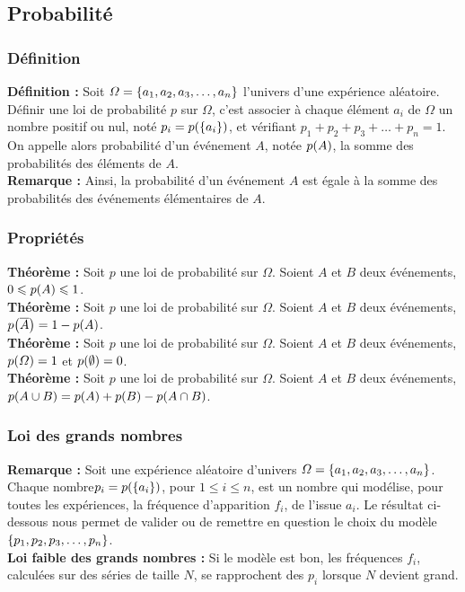 \documentclass[a4paper,titlepage]{article}
\let\oldleft\left
\renewcommand{\left}{\mathopen{}\mathclose\bgroup\oldleft}
\let\oldright\right
\renewcommand{\right}{\aftergroup\egroup\oldright}
\begin{document}
    \subsection{Probabilité}
        \subsubsection{Définition}
            \textbf{Définition :} Soit $\varOmega=\left\{a_{1},a_{2},a_{3},\ldots,a_{n}\right\}$ l’univers d’une expérience aléatoire. Définir une loi de probabilité $p$ sur $\varOmega$, c’est associer à chaque élément $a_{i}$ de $\varOmega$ un nombre positif ou nul, noté $p_{i}=p\left(\left\{a_{i}\right\}\right)$, et vérifiant $p_{1}+p_{2}+p_{3}+\ldots+p_{n}=1$. On appelle alors probabilité d’un événement $A$, notée $p\left(A\right)$, la somme des probabilités des éléments de $A$.
            \\
            \textbf{Remarque :} Ainsi, la probabilité d’un événement $A$ est égale à la somme des probabilités des événements élémentaires de $A$.
        \subsubsection{Propriétés}
            \textbf{Théorème :} Soit $p$ une loi de probabilité sur $\varOmega$. Soient $A$ et $B$ deux événements, $0\leqslant p\left(A\right)\leqslant1$.
            \\
            \textbf{Théorème :} Soit $p$ une loi de probabilité sur $\varOmega$. Soient $A$ et $B$ deux événements, $p\left(\overline{A}\right)=1-p\left(A\right)$.
            \\
            \textbf{Théorème :} Soit $p$ une loi de probabilité sur $\varOmega$. Soient $A$ et $B$ deux événements, $p\left(\varOmega\right)=1$ et $p\left(\emptyset\right)=0$.
            \\
            \textbf{Théorème :} Soit $p$ une loi de probabilité sur $\varOmega$. Soient $A$ et $B$ deux événements,\linebreak$p\left(A\cup B\right)=p\left(A\right)+p\left(B\right)-p\left(A\cap B\right)$.
        \subsubsection{Loi des grands nombres}
            \textbf{Remarque :} Soit une expérience aléatoire d’univers $\varOmega=\left\{a_{1},a_{2},a_{3},\ldots,a_{n}\right\}$. Chaque nombre\linebreak$p_{i}=p\left(\left\{a_{i}\right\}\right)$, pour $1\leqslant i\leqslant n$, est un nombre qui modélise, pour toutes les expériences, la fréquence d’apparition $f_{i}$, de l’issue $a_{i}$. Le résultat ci-dessous nous permet de valider ou de remettre en question le choix du modèle $\left\{p_{1},p_{2},p_{3},\ldots,p_{n}\right\}$.
            \\
            \textbf{Loi faible des grands nombres :} Si le modèle est bon, les fréquences $f_{i}$, calculées sur des séries de taille $N$, se rapprochent des $p_{i}$ lorsque $N$ devient grand.
\end{document}
